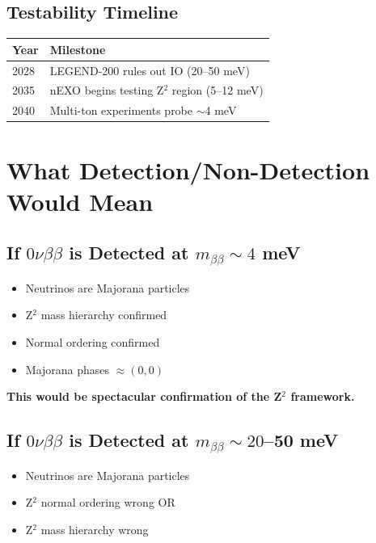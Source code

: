 \documentclass[12pt,a4paper]{article}
\begin{document}
\subsection{Testability Timeline}

\begin{center}
\begin{tabular}{@{}ll@{}}
\toprule
Year & Milestone \\
\midrule
2028 & LEGEND-200 rules out IO (20--50 meV) \\
2035 & nEXO begins testing Z$^2$ region (5--12 meV) \\
2040 & Multi-ton experiments probe $\sim$4 meV \\
\bottomrule
\end{tabular}
\end{center}

\section{What Detection/Non-Detection Would Mean}

\subsection{If $0\nu\beta\beta$ is Detected at $m_{\beta\beta} \sim 4$ meV}

\begin{itemize}
\item[\checkmark] Neutrinos are Majorana particles
\item[\checkmark] Z$^2$ mass hierarchy confirmed
\item[\checkmark] Normal ordering confirmed
\item[\checkmark] Majorana phases $\approx (0, 0)$
\end{itemize}

\textbf{This would be spectacular confirmation of the Z$^2$ framework.}

\subsection{If $0\nu\beta\beta$ is Detected at $m_{\beta\beta} \sim 20$--50 meV}

\begin{itemize}
\item[\checkmark] Neutrinos are Majorana particles
\item[$\times$] Z$^2$ normal ordering wrong OR
\item[$\times$] Z$^2$ mass hierarchy wrong
\end{itemize}
\end{document}
